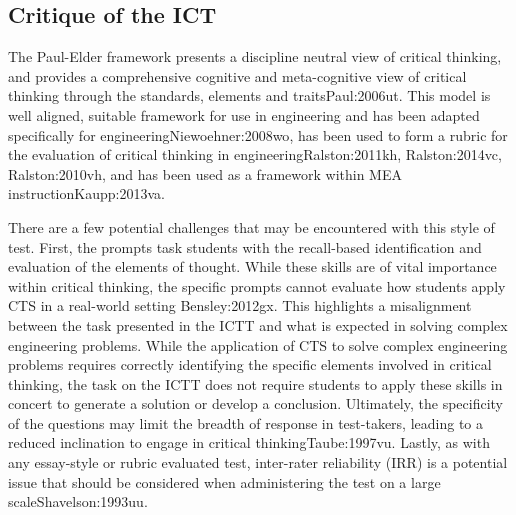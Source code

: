 \subsection{Critique of the ICT}


The Paul-Elder framework presents a discipline neutral view of critical thinking, and provides a comprehensive cognitive and meta-cognitive view of critical thinking through the standards, elements and traits{Paul:2006ut}.  This model is well aligned, suitable framework for use in engineering and has been adapted specifically for engineering{Niewoehner:2008wo}, has been used to form a rubric for the evaluation of critical thinking in engineering{Ralston:2011kh, Ralston:2014vc, Ralston:2010vh}, and has been used as a framework within MEA instruction{Kaupp:2013va}. 

There are a few potential challenges that may be encountered with this style of test. First, the prompts task students with the recall-based identification and evaluation of the elements of thought. While these skills are of vital importance within critical thinking, the specific prompts cannot evaluate how students apply CTS in a real-world setting {Bensley:2012gx}.  This highlights a misalignment between the task presented in the ICTT and what is expected in solving complex engineering problems.  While the application of CTS to solve complex engineering problems requires correctly identifying the specific elements involved in critical thinking, the task on the ICTT does not require students to apply these skills in concert to generate a solution or develop a conclusion.  Ultimately, the specificity of the questions may limit the breadth of response in test-takers, leading to a reduced inclination to engage in critical thinking{Taube:1997vu}. Lastly, as with any essay-style or rubric evaluated test, inter-rater reliability (IRR) is a potential issue that should be considered when administering the test on a large scale{Shavelson:1993uu}. 
